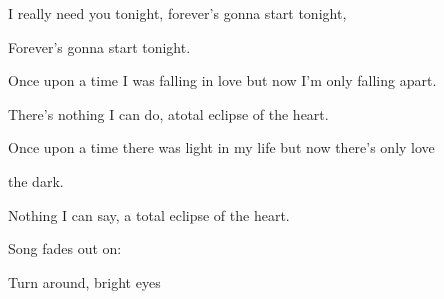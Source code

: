 I really need you tonight, forever's gonna start tonight,

Forever's gonna start tonight.

Once upon a time I was falling in love but now I'm only falling apart.

There's nothing I can do, atotal eclipse of the heart.

   

Once upon a time there was light in my life but now there's only love

the dark.

Nothing I can say, a total eclipse of the heart.    

Song fades out on:

Turn around, bright eyes  

